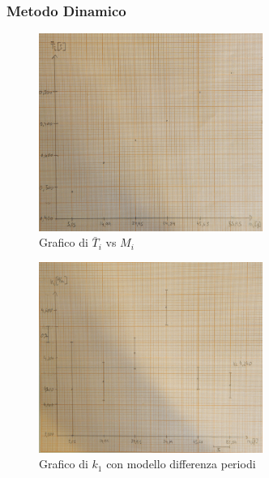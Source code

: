 \documentclass[a4paper]{article}
\begin{document}
{\subsubsection{Metodo Dinamico}
\begin{figure}[!ht]
    \centering
    \includegraphics[width=0.65\textwidth]{fotomolla/Molla 1/m1dinamico_tm.jpg}
    \caption{Grafico di $\bar{T}_i$ vs $M_i$}
\end{figure}

\begin{figure}[!ht]
    \centering
    \includegraphics[width=0.65\textwidth]{fotomolla/Molla 1/m1dinamico_diffperiodo.jpg}
    \caption{Grafico di $k_1$ con modello differenza periodi}
\end{figure}

}
\end{document}
